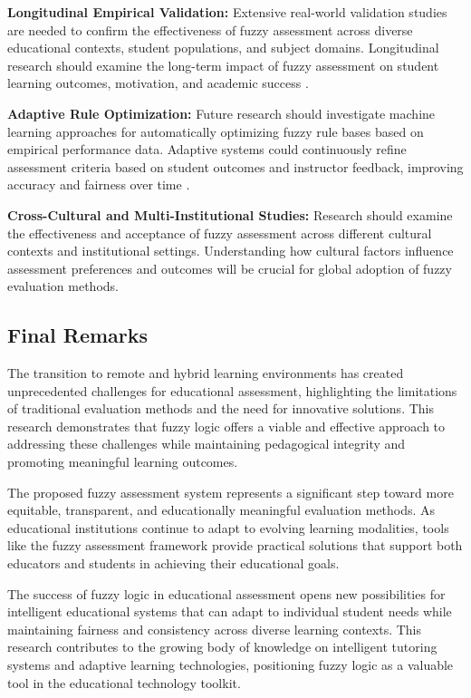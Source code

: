 \textbf{Longitudinal Empirical Validation:} Extensive real-world validation studies are needed to confirm the effectiveness of fuzzy assessment across diverse educational contexts, student populations, and subject domains. Longitudinal research should examine the long-term impact of fuzzy assessment on student learning outcomes, motivation, and academic success \cite{Martinez2024}.

\textbf{Adaptive Rule Optimization:} Future research should investigate machine learning approaches for automatically optimizing fuzzy rule bases based on empirical performance data. Adaptive systems could continuously refine assessment criteria based on student outcomes and instructor feedback, improving accuracy and fairness over time \cite{Chen2023}.

\textbf{Cross-Cultural and Multi-Institutional Studies:} Research should examine the effectiveness and acceptance of fuzzy assessment across different cultural contexts and institutional settings. Understanding how cultural factors influence assessment preferences and outcomes will be crucial for global adoption of fuzzy evaluation methods.

\subsection{Final Remarks}

The transition to remote and hybrid learning environments has created unprecedented challenges for educational assessment, highlighting the limitations of traditional evaluation methods and the need for innovative solutions. This research demonstrates that fuzzy logic offers a viable and effective approach to addressing these challenges while maintaining pedagogical integrity and promoting meaningful learning outcomes.

The proposed fuzzy assessment system represents a significant step toward more equitable, transparent, and educationally meaningful evaluation methods. As educational institutions continue to adapt to evolving learning modalities, tools like the fuzzy assessment framework provide practical solutions that support both educators and students in achieving their educational goals.

The success of fuzzy logic in educational assessment opens new possibilities for intelligent educational systems that can adapt to individual student needs while maintaining fairness and consistency across diverse learning contexts. This research contributes to the growing body of knowledge on intelligent tutoring systems and adaptive learning technologies, positioning fuzzy logic as a valuable tool in the educational technology toolkit.
